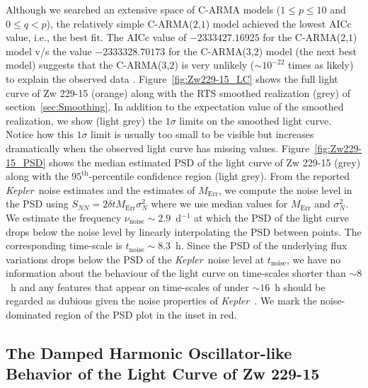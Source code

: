 \documentclass[a4paper,fleqn,usenatbib]{mnras}
\newcommand{\Kepler}{\textit{Kepler~}}
\begin{document}
Although we searched an extensive space of C-ARMA models ($1 \leq p \leq 10$ and $0 \leq q < p$), the relatively simple C-ARMA($2$,$1$) model achieved the lowest AICc value, i.e., the best fit. The AICc value of $-2333427.16925$ for the C-ARMA($2$,$1$) model v/s the value $-2333328.70173$ for the C-ARMA($3$,$2$) model (the next best model) suggests that the C-ARMA($3$,$2$) is very unlikely ($\sim 10^{-22}$ times as likely) to explain the observed data \citep{ModelSelection}. Figure~\ref{fig:Zw229-15_LC} shows the full light curve of Zw 229-15 (orange) along with the RTS smoothed realization (grey) of section~\ref{sec:Smoothing}. In addition to the expectation value of the smoothed realization, we show (light grey) the $1\sigma$ limits on the smoothed light curve. Notice how this $1\sigma$ limit is usually too small to be visible but increases dramatically when the observed light curve has missing values. Figure~\ref{fig:Zw229-15_PSD} shows the median estimated PSD of the light curve of Zw 229-15 (grey) along with the $95^{\mathrm{th}}$-percentile confidence region (light grey). From the reported \Kepler noise estimates and the estimates of $M_{\mathrm{Err}}$, we compute the noise level in the PSD using $S_{NN} = 2\delta t M_{\mathrm{Err}} \sigma^{2}_{N}$ where we use median values for $M_{\mathrm{Err}}$ and $\sigma^{2}_{N}$. We estimate the frequency $\nu_{\mathrm{noise}} \sim 2.9$~d$^{-1}$ at which the PSD of the light curve drops below the noise level by linearly interpolating the PSD between points. The corresponding time-scale is $t_{\mathrm{noise}} \sim 8.3$~h. Since the PSD of the underlying flux variations drops below the PSD of the \Kepler noise level at $t_{\mathrm{noise}}$, we have no information about the behaviour of the light curve on time-scales shorter than $\sim 8$~h and any features that appear on time-scales of under $\sim 16$~h should be regarded as dubious given the noise properties of \Kepler. We mark the noise-dominated region of the PSD plot in the inset in red.

\subsection[dHO Behavior of Zw 229-15]{The Damped Harmonic Oscillator-like Behavior of the Light Curve of Zw 229-15}\label{sec:DHO}
\end{document}
